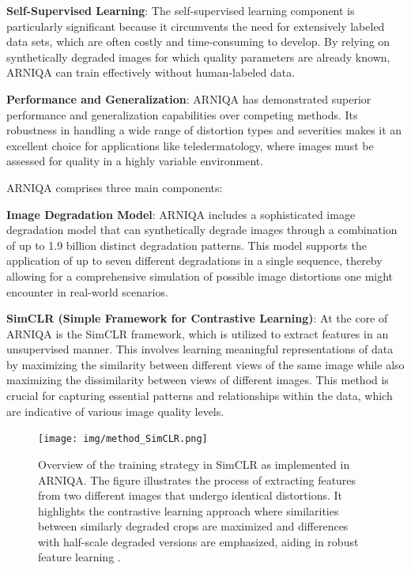 \textbf{Self-Supervised Learning}: The self-supervised learning component is particularly significant because it circumvents the need for extensively labeled data sets, which are often costly and time-consuming to develop. By relying on synthetically degraded images for which quality parameters are already known, ARNIQA can train effectively without human-labeled data. \par
\vspace{\baselineskip}
\noindent
\textbf{Performance and Generalization}: ARNIQA has demonstrated superior performance and generalization capabilities over competing methods. Its robustness in handling a wide range of distortion types and severities makes it an excellent choice for applications like teledermatology, where images must be assessed for quality in a highly variable environment. \par
\vspace{\baselineskip}
\noindent
ARNIQA comprises three main components: 
\par
\vspace{\baselineskip}
\noindent
\textbf{Image Degradation Model}: ARNIQA includes a sophisticated image degradation model that can synthetically degrade images through a combination of up to 1.9 billion distinct degradation patterns. This model supports the application of up to seven different degradations in a single sequence, thereby allowing for a comprehensive simulation of possible image distortions one might encounter in real-world scenarios. \par
\vspace{\baselineskip}
\noindent
\textbf{SimCLR (Simple Framework for Contrastive Learning)}: At the core of ARNIQA is the SimCLR framework, which is utilized to extract features in an unsupervised manner. This involves learning meaningful representations of data by maximizing the similarity between different views of the same image while also maximizing the dissimilarity between views of different images. This method is crucial for capturing essential patterns and relationships within the data, which are indicative of various image quality levels. \par
\begin{figure}[ht]
    \centering
    \texttt{[image: img/method\_SimCLR.png]}
    \caption{Overview of the training strategy in SimCLR as implemented in ARNIQA. The figure illustrates the process of extracting features from two different images that undergo identical distortions. It highlights the contrastive learning approach where similarities between similarly degraded crops are maximized and differences with half-scale degraded versions are emphasized, aiding in robust feature learning \autocite{ARNIQA}.}
    \label{fig:SimCLR}
\end{figure}

